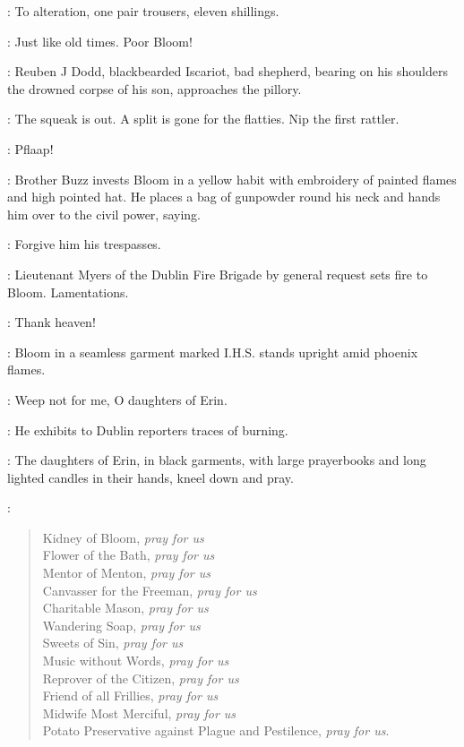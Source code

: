 \Mesias:
To alteration, one pair trousers, eleven shillings.

\Bloom:
Just like old times.
Poor Bloom!

:
Reuben J Dodd, blackbearded Iscariot, bad shepherd,
bearing on his shoulders the drowned corpse of his son,
approaches the pillory.%

\ReubenJ:
The squeak is out.
A split is gone for the flatties.
Nip the first rattler.

\FireBrigade:
Pflaap!

:
Brother Buzz invests Bloom in a yellow habit
with embroidery of painted flames and high pointed hat.
He places a bag of gunpowder round his neck
and hands him over to the civil power, saying.

\BrotherBuzz:
Forgive him his trespasses.

:
Lieutenant Myers of the Dublin Fire Brigade
by general request sets fire to Bloom.
Lamentations.

\Citizen[1]:
Thank heaven!

:
Bloom in a seamless garment marked I.H.S.
stands upright amid phoenix flames.

\Bloom:
Weep not for me, O daughters of Erin.

:
He exhibits to Dublin reporters traces of burning.

:
The daughters of Erin, in black garments,
with large prayerbooks and long lighted candles in their hands,
kneel down and pray.

\DaughtersErin:
\begin{verse}
    Kidney of Bloom, \emph{pray for us}\\
    Flower of the Bath, \emph{pray for us}\\
    Mentor of Menton, \emph{pray for us}\\
    Canvasser for the Freeman, \emph{pray for us}\\
    Charitable Mason, \emph{pray for us}\\
    Wandering Soap, \emph{pray for us}\\
    Sweets of Sin, \emph{pray for us}\\
    Music without Words, \emph{pray for us}\\
    Reprover of the Citizen, \emph{pray for us}\\
%
    Friend of all Frillies, \emph{pray for us}\\
    Midwife Most Merciful, \emph{pray for us}\\
    Potato Preservative against Plague and Pestilence, \emph{pray for us}.
\end{verse}

